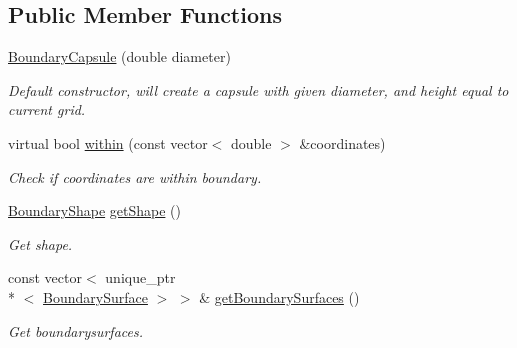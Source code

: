 \subsection*{Public Member Functions}
\begin{DoxyCompactItemize}
\item 
\hyperlink{classBoundaryCapsule_a8a5ab010ef57a344a1cb0a233572b0e1}{Boundary\+Capsule} (double diameter)
\begin{DoxyCompactList}\small\item\em Default constructor, will create a capsule with given diameter, and height equal to current grid. \end{DoxyCompactList}\item 
virtual bool \hyperlink{classBoundaryCapsule_a9e462a1fbb221933735c35df1e7eb75d}{within} (const vector$<$ double $>$ \&coordinates)
\begin{DoxyCompactList}\small\item\em Check if coordinates are within boundary. \end{DoxyCompactList}\item 
\hyperlink{Boundary_8h_a0099b369f2bc119c1b54728734b41132}{Boundary\+Shape} \hyperlink{classBoundary_a20d2121527b207eed35f6719393e3499}{get\+Shape} ()
\begin{DoxyCompactList}\small\item\em Get shape. \end{DoxyCompactList}\item 
const vector$<$ unique\+\_\+ptr\\*
$<$ \hyperlink{classBoundarySurface}{Boundary\+Surface} $>$ $>$ \& \hyperlink{classBoundary_acfa6640f65c432e339108887913539eb}{get\+Boundary\+Surfaces} ()
\begin{DoxyCompactList}\small\item\em Get boundarysurfaces. \end{DoxyCompactList}\end{DoxyCompactItemize}
